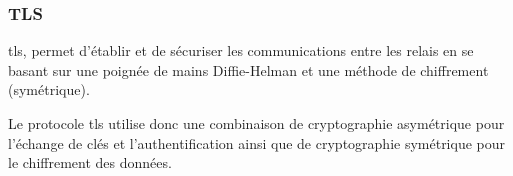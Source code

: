   
  
  


\subsubsection{TLS}\label{subsubsec:tls}

\acrfull{tls}, permet d'établir et de sécuriser les communications entre les relais en se basant sur une poignée de mains Diffie-Helman et une méthode de chiffrement (symétrique).

Le protocole \acrshort{tls} utilise donc une combinaison de cryptographie asymétrique pour l'échange de clés et l'authentification ainsi que de cryptographie symétrique pour le chiffrement des données.
